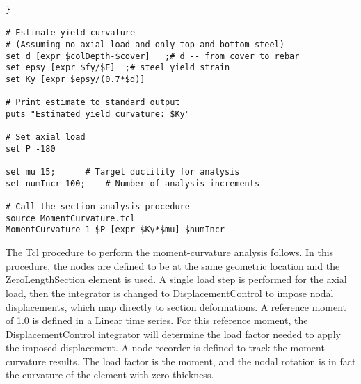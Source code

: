 \documentclass[12pt]{article}
\begin{document}
{\begin{verbatim}
}    

# Estimate yield curvature
# (Assuming no axial load and only top and bottom steel)
set d [expr $colDepth-$cover]	;# d -- from cover to rebar
set epsy [expr $fy/$E]	;# steel yield strain
set Ky [expr $epsy/(0.7*$d)]

# Print estimate to standard output
puts "Estimated yield curvature: $Ky"

# Set axial load 
set P -180

set mu 15;		# Target ductility for analysis
set numIncr 100;	# Number of analysis increments

# Call the section analysis procedure
source MomentCurvature.tcl
MomentCurvature 1 $P [expr $Ky*$mu] $numIncr
\end{verbatim}
}

The Tcl procedure to perform the moment-curvature analysis follows.
In this procedure, the nodes are defined to be at the same geometric
location and the ZeroLengthSection element is used. A single load
step is performed for the axial load, then the integrator is changed
to DisplacementControl to impose nodal displacements, which map
directly to section deformations. A reference moment of 1.0 is defined
in a Linear time series. For this reference moment, the
DisplacementControl integrator will determine the load factor needed
to apply the imposed displacement. A node recorder is defined to
track the moment-curvature results. The load factor is the moment, and
the nodal rotation is in fact the curvature of the element with zero
thickness.
\end{document}
